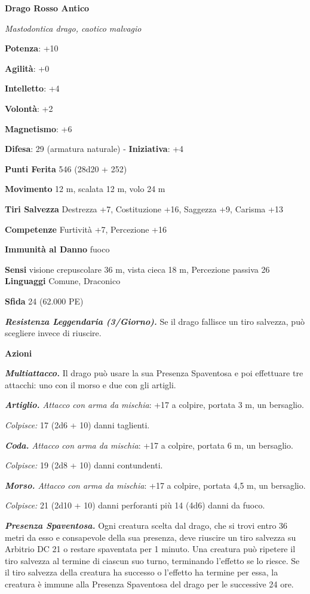 \begin{multicols}{2}
\textbf{Drago Rosso Antico}

\emph{Mastodontica drago, caotico malvagio}

\textbf{Potenza}: +10

\textbf{Agilità}: +0

\textbf{Intelletto}: +4

\textbf{Volontà}: +2

\textbf{Magnetismo}: +6

\textbf{Difesa}: 29 (armatura naturale) - \textbf{Iniziativa}: +4

\textbf{Punti Ferita} 546 (28d20 + 252)

\textbf{Movimento} 12 m, scalata 12 m, volo 24 m

\textbf{Tiri Salvezza} Destrezza +7, Costituzione +16, Saggezza +9,
Carisma +13

\textbf{Competenze} Furtività +7, Percezione +16

\textbf{Immunità al Danno} fuoco

\textbf{Sensi} visione crepuscolare 36 m, vista cieca 18 m, Percezione passiva
26 \textbf{Linguaggi} Comune, Draconico

\textbf{Sfida} 24 (62.000 PE)\smallskip

\emph{\textbf{Resistenza Leggendaria (3/Giorno).}} Se il drago fallisce
un tiro salvezza, può scegliere invece di riuscire.

\smallskip\textbf{Azioni}

\emph{\textbf{Multiattacco.}} Il drago può usare la sua Presenza
Spaventosa e poi effettuare tre attacchi: uno con il morso e due con gli
artigli.

\emph{\textbf{Artiglio.} Attacco con arma da mischia}: +17 a colpire,
portata 3 m, un bersaglio.

\emph{Colpisce:} 17 (2d6 + 10) danni taglienti.

\emph{\textbf{Coda.} Attacco con arma da mischia}: +17 a colpire,
portata 6 m, un bersaglio.

\emph{Colpisce:} 19 (2d8 + 10) danni contundenti.

\emph{\textbf{Morso.} Attacco con arma da mischia}: +17 a colpire,
portata 4,5 m, un bersaglio.

\emph{Colpisce:} 21 (2d10 + 10) danni perforanti più 14 (4d6) danni da
fuoco.

\emph{\textbf{Presenza Spaventosa.}} Ogni creatura scelta dal drago, che
si trovi entro 36 metri da esso e consapevole della sua presenza, deve
riuscire un tiro salvezza su Arbitrio DC 21 o restare spaventata per 1
minuto. Una creatura può ripetere il tiro salvezza al termine di ciascun
suo turno, terminando l'effetto se lo riesce. Se il tiro salvezza della
creatura ha successo o l'effetto ha termine per essa, la creatura è
immune alla Presenza Spaventosa del drago per le successive 24 ore.


\end{multicols}
